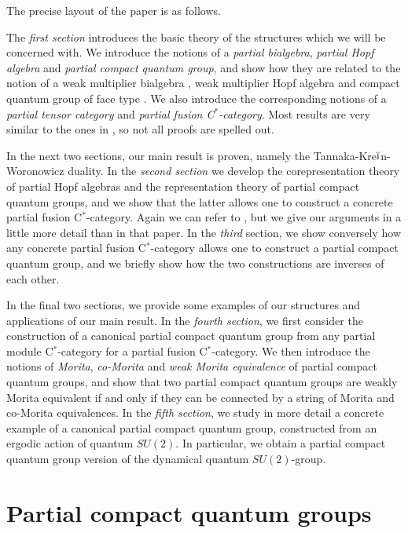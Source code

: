 \documentclass[10pt]{article}
\theoremstyle{definition}
\numberwithin{equation}{section}
\begin{document}
The precise layout of the paper is as follows.

The \emph{first section} introduces the basic theory of the structures
which we will be concerned with. We introduce the notions of a
\emph{partial bialgebra}, \emph{partial Hopf algebra} and
\emph{partial compact quantum group}, and show how they are related to
the notion of a weak multiplier bialgebra \cite{Boh1}, weak multiplier
Hopf algebra \cite{VDW1,VDW2} and compact quantum group of face type
\cite{Hay1}. We also introduce the corresponding notions of a \emph{partial tensor category} and \emph{partial fusion C$^*$-category}. Most results are very similar to the ones in \cite{Hay1}, so not all proofs are spelled out.

In the next two sections, our main result is proven, namely the Tannaka-Kre$\breve{\textrm{\i}}$n-Woronowicz duality. In the \emph{second section} we develop the corepresentation theory of partial Hopf algebras and the representation theory of partial compact quantum groups, and we show that the latter allows one to construct a concrete partial fusion C$^*$-category. Again we can refer to \cite{Hay1}, but we give our arguments in a little more detail than in that paper. In the \emph{third} section, we show conversely how any concrete partial fusion C$^*$-category allows one to construct a partial compact quantum group, and we briefly show how the two constructions are inverses of each other.

In the final two sections, we provide some examples of our structures and applications of our main result. In the \emph{fourth section}, we first consider the construction of a canonical partial compact quantum group from any partial module C$^*$-category for a partial fusion C$^*$-category. We then introduce the notions of \emph{Morita}, \emph{co-Morita} and \emph{weak Morita equivalence} \cite{Mug1} of partial compact quantum groups, and show that two partial compact quantum groups are weakly Morita equivalent if and only if they can be connected by a string of Morita and co-Morita equivalences. In the \emph{fifth section}, we study in more detail a concrete example of a canonical partial compact quantum group, constructed from an ergodic action of quantum $SU(2)$. In particular, we obtain a partial compact quantum group version of the dynamical quantum $SU(2)$-group. 

\section{Partial compact quantum groups}
\end{document}
